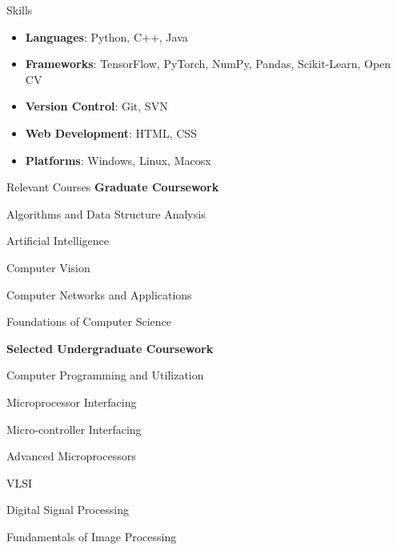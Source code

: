 \documentclass{resume}
\begin{document}
\begin{rSection}{Skills}
\begin{itemize}
    \item {\bf Languages}: Python, C++, Java 
    \item {\bf Frameworks}: TensorFlow, PyTorch, NumPy, Pandas, Scikit-Learn, Open CV
    \item {\bf Version Control}: Git, SVN
    \item {\bf Web Development}: HTML, CSS
    \item {\bf Platforms}: Windows, Linux, Macosx
\end{itemize}
\end{rSection} 
\begin{rSection}{Relevant Courses}
{\bf Graduate Coursework} \\
\begin{inparaitem}
\item Algorithms and Data Structure Analysis
\item Artificial Intelligence
\item Computer Vision
\item Computer Networks and Applications
\item Foundations of Computer Science
\end{inparaitem} 

{\bf Selected Undergraduate Coursework} \\ 
\begin{inparaitem}
\item Computer Programming and Utilization
\item Microprocessor Interfacing
\item Micro-controller Interfacing
\item Advanced Microprocessors
\item VLSI
\item Digital Signal Processing
\item Fundamentals of Image Processing
\end{inparaitem} 
\end{rSection}
\end{document}
